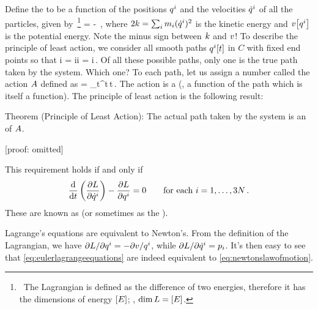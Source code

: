 Define the  to be a function of the positions ${q}^{i}$ and the velocities ${\dot{q}}^{i}$ of all the particles, given by~\footnote{~The Lagrangian is defined as the difference of two energies, therefore it has the dimensions of energy $\left[{E}\right]$; \ie, $\dim L = \left[{E}\right]$.}
\beq
\lag{} = \ken{} - \pen{}\,,
\eeq
where $2k = \sum_i m_i ({\dot{q}}^{i})^2$ is the kinetic energy and $v\!\left[{{q}^{i}}\right]$ is the potential energy. Note the minus sign between $k$ and $v$! To describe the principle of least action, we consider all smooth paths ${q}^{i}\!\left[{t}\right]$ in $C$ with fixed end points so that
\beq
\gpos i = \gpos i\qquad{}\qquad\gpos i = \gpos i\,.
\eeq
Of all these possible paths, only one is the true path taken by the system. Which one? To each path, let us assign a number called the action $A$ defined as
\beq
\action{} = \int_{t}^{t}\lag{}\,\dx t\,.
\eeq
The action is a  (\ie, a function of the path which is itself a function). The principle of least action is the following result:

Theorem (Principle of Least Action): The actual path taken by the system is an  of $A$.

[proof: omitted]

This requirement holds if and only if
\begin{equation}\label{eq:eulerlagrangeequations}
\dfrac{\text{d}{}}{\text{d}{t}} \left(\dfrac{\partial{L}}{\partial{{\dot{q}}^{i}}}\right) - \dfrac{\partial{L}}{\partial{{q}^{i}}} = 0\qquad\text{for each $i=1,\dotsc,3N$}\,.
\end{equation}
These are known as  (or sometimes as the ). 

Lagrange's equations are equivalent to Newton's. From the definition of the Lagrangian, we have $\partial L/\partial{q}^{i} = -\partial v/{q}^{i}$, while $\partial L/\partial{\dot{q}}^{i} = {p}_{i}$. It's then easy to see that \cref{eq:eulerlagrangeequations} are indeed equivalent to \cref{eq:newtonslawofmotion}.

